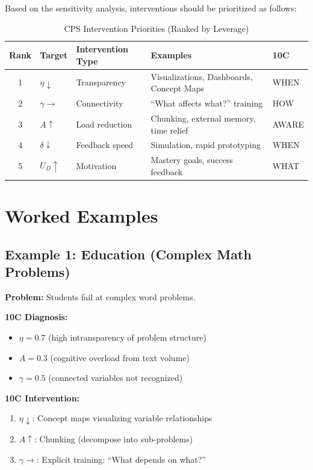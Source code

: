 Based on the sensitivity analysis, interventions should be prioritized as follows:

\begin{table}[htbp]
\centering
\caption{CPS Intervention Priorities (Ranked by Leverage)}
\label{tab:cps-interventions}
\begin{tabular}{cllll}
\toprule
\textbf{Rank} & \textbf{Target} & \textbf{Intervention Type} & \textbf{Examples} & \textbf{10C} \\
\midrule
1 & $\eta \downarrow$ & Transparency & Visualizations, Dashboards, Concept Maps & WHEN \\
2 & $\gamma \rightarrow$ & Connectivity & ``What affects what?'' training & HOW \\
3 & $A \uparrow$ & Load reduction & Chunking, external memory, time relief & AWARE \\
4 & $\delta \downarrow$ & Feedback speed & Simulation, rapid prototyping & WHEN \\
5 & $U_D \uparrow$ & Motivation & Mastery goals, success feedback & WHAT \\
\bottomrule
\end{tabular}
\end{table}



\section{Worked Examples}
\label{sec:cps-examples}

\subsection{Example 1: Education (Complex Math Problems)}

\textbf{Problem:} Students fail at complex word problems.

\textbf{10C Diagnosis:}
\begin{itemize}
\item $\eta = 0.7$ (high intransparency of problem structure)
\item $A = 0.3$ (cognitive overload from text volume)
\item $\gamma = 0.5$ (connected variables not recognized)
\end{itemize}

\textbf{10C Intervention:}
\begin{enumerate}
\item $\eta \downarrow$: Concept maps visualizing variable relationships
\item $A \uparrow$: Chunking (decompose into sub-problems)
\item $\gamma \rightarrow$: Explicit training: ``What depends on what?''
\end{enumerate}

